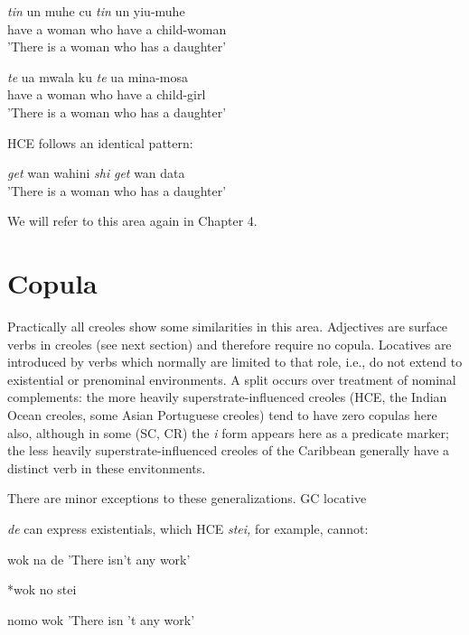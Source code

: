  

\ea\label{ex:57}
\gll \textit{tin} un muhe cu \textit{tin} un yiu-muhe\\
have a woman who have a child-woman \\
\glt'There is a woman who has a daughter'
\z



\ea\label{ex:58}
 \gll \textit{te} ua mwala ku \textit{te} ua mina-mosa \\
have a woman who have a child-girl\\
\glt'There is a woman who has a daughter'
\z


HCE follows an identical pattern:

\ea\label{ex:59}
 \textit{get} wan wahini \textit{shi} \textit{get} wan data\\
\glt 'There is a woman who has a daughter' 
\z

We will refer to this area again in Chapter 4.

\section{Copula}

Practically all creoles show some similarities in this area. Adjec\-tives are surface verbs in creoles (see next section) and therefore require no copula. Locatives are introduced by verbs which normally are limited to that role, i.e., do not extend to existential or prenominal environments. A split occurs over treatment of nominal complements: the more heavily superstrate-influenced creoles (HCE, the Indian Ocean creoles, some Asian Portuguese creoles) tend to have zero copulas here also, although in some (SC, CR) the \textit{i} form appears here as a predicate marker; the less heavily superstrate-influenced creoles of the Caribbean generally have a distinct verb in these envitonments.

There are minor exceptions to these generalizations. GC locative

\textit{de} can express existentials, which HCE \textit{stei,} for example, cannot:

\ea\label{ex:60}
 wok na de
\glt'There isn't any work'
\z



\ea\label{ex:61}
 *wok no stei 
\z

\ea\label{ex:62}
 nomo wok
\glt'There isn 't any work'
\z



